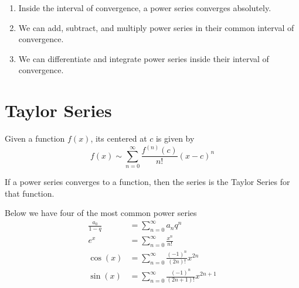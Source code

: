 \documentclass[12pt, a4paper, oneside, openright, titlepage]{book}
\begin{document}

\begin{obs}
        \begin{enumerate}
                \item Inside the interval of convergence, a power series converges absolutely.
                \item We can add, subtract, and multiply power series in their common interval of convergence.
                \item We can differentiate and integrate power series inside their interval of convergence.
        \end{enumerate}
\end{obs}



\section{Taylor Series}


\begin{defn}
        Given a function $f(x)$, its  centered at $c$ is given by \begin{equation}
                f(x) \sim \sum\limits_{n=0}^{\infty}\frac{f^{(n)}(c)}{n!}(x-c)^n
        \end{equation}
\end{defn}


\begin{thm}
        If a power series converges to a function, then the series is the Taylor Series for that function.
\end{thm}




\begin{thm}
        Below we have four of the most common power series \begin{align}
                \frac{a_0}{1-q} &= \sum\limits_{n=0}^{\infty}a_nq^n \\
                e^x &= \sum\limits_{n=0}^{\infty}\frac{x^n}{n!} \\
                \cos(x) &= \sum\limits_{n=0}^{\infty}\frac{(-1)^n}{(2n)!}x^{2n} \\
                \sin(x) &= \sum\limits_{n=0}^{\infty}\frac{(-1)^n}{(2n+1)!}x^{2n+1}
        \end{align}
\end{thm}
\end{document}
